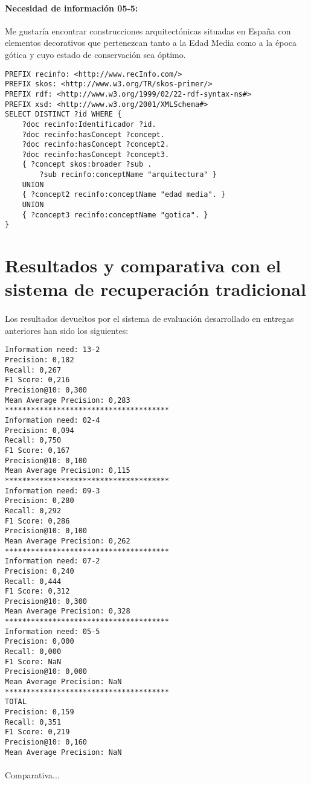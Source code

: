 \documentclass[a4paper]{article}
\begin{document}
\paragraph{Necesidad de información 05-5:}Me gustaría encontrar construcciones arquitectónicas situadas en España con elementos decorativos que pertenezcan tanto a la Edad Media como a la época gótica y cuyo estado de conservación sea óptimo.
\begin{lstlisting}[captionpos=b, caption=Consulta SPARQL para la necesidad de información 05-5, label=lst:sparql,
basicstyle=\ttfamily,frame=single]
PREFIX recinfo: <http://www.recInfo.com/>
PREFIX skos: <http://www.w3.org/TR/skos-primer/>
PREFIX rdf: <http://www.w3.org/1999/02/22-rdf-syntax-ns#>
PREFIX xsd: <http://www.w3.org/2001/XMLSchema#>
SELECT DISTINCT ?id WHERE {
	?doc recinfo:Identificador ?id.
	?doc recinfo:hasConcept ?concept.
	?doc recinfo:hasConcept ?concept2.
	?doc recinfo:hasConcept ?concept3.
	{ ?concept skos:broader ?sub . 
		?sub recinfo:conceptName "arquitectura" }
	UNION
	{ ?concept2 recinfo:conceptName "edad media". }
	UNION
	{ ?concept3 recinfo:conceptName "gotica". }
}
\end{lstlisting}
\newpage
\section{Resultados y comparativa con el sistema de recuperación tradicional}
\paragraph{}Los resultados devueltos por el sistema de evaluación desarrollado en entregas anteriores han sido los siguientes:
\begin{lstlisting}[captionpos=b, caption=Resultados,
basicstyle=\ttfamily,frame=single]
Information need: 13-2
Precision: 0,182
Recall: 0,267
F1 Score: 0,216
Precision@10: 0,300
Mean Average Precision: 0,283
**************************************
Information need: 02-4
Precision: 0,094
Recall: 0,750
F1 Score: 0,167
Precision@10: 0,100
Mean Average Precision: 0,115
**************************************
Information need: 09-3
Precision: 0,280
Recall: 0,292
F1 Score: 0,286
Precision@10: 0,100
Mean Average Precision: 0,262
**************************************
Information need: 07-2
Precision: 0,240
Recall: 0,444
F1 Score: 0,312
Precision@10: 0,300
Mean Average Precision: 0,328
**************************************
Information need: 05-5
Precision: 0,000
Recall: 0,000
F1 Score: NaN
Precision@10: 0,000
Mean Average Precision: NaN
**************************************
TOTAL
Precision: 0,159
Recall: 0,351
F1 Score: 0,219
Precision@10: 0,160
Mean Average Precision: NaN
\end{lstlisting}
\newpage
\paragraph{}Comparativa...
\end{document}
